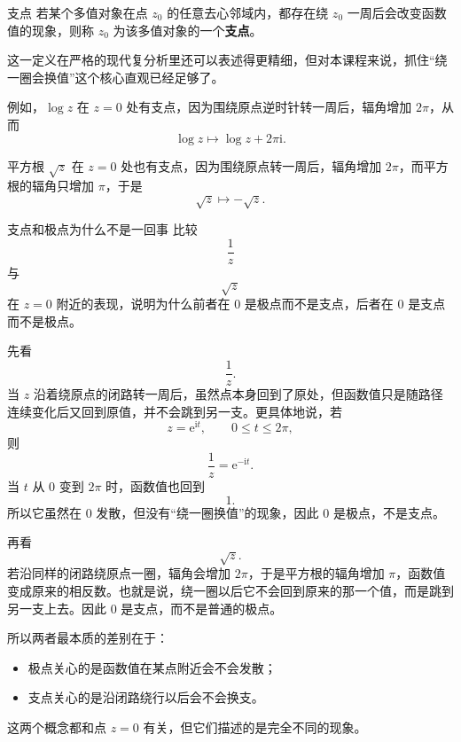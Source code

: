 \begin{dingliyi}{支点}{}
若某个多值对象在点 $z_0$ 的任意去心邻域内，都存在绕 $z_0$ 一周后会改变函数值的现象，则称 $z_0$ 为该多值对象的一个\textbf{支点}。
\end{dingliyi}

\begin{zhu}{}{}
这一定义在严格的现代复分析里还可以表述得更精细，但对本课程来说，抓住``绕一圈会换值''这个核心直观已经足够了。
\end{zhu}

例如，$\log z$ 在 $z=0$ 处有支点，因为围绕原点逆时针转一周后，辐角增加 $2\pi$，从而
\[
    \log z
    \longmapsto
    \log z+2\pi\mathrm{i}.
\]

平方根 $\sqrt{z}$ 在 $z=0$ 处也有支点，因为围绕原点转一周后，辐角增加 $2\pi$，而平方根的辐角只增加 $\pi$，于是
\[
    \sqrt{z}
    \longmapsto
    -\sqrt{z}.
\]

\begin{lizi}{支点和极点为什么不是一回事}{}
比较
\[
    \frac{1}{z}
\]
与
\[
    \sqrt{z}
\]
在 $z=0$ 附近的表现，说明为什么前者在 $0$ 是极点而不是支点，后者在 $0$ 是支点而不是极点。

\begin{jie}
先看
\[
    \frac{1}{z}.
\]
当 $z$ 沿着绕原点的闭路转一周后，虽然点本身回到了原处，但函数值只是随路径连续变化后又回到原值，并不会跳到另一支。更具体地说，若
\[
    z=\mathrm{e}^{\mathrm{i}t},\qquad 0\le t\le 2\pi,
\]
则
\[
    \frac{1}{z}=\mathrm{e}^{-\mathrm{i}t}.
\]
当 $t$ 从 $0$ 变到 $2\pi$ 时，函数值也回到
\[
    1.
\]
所以它虽然在 $0$ 发散，但没有``绕一圈换值''的现象，因此 $0$ 是极点，不是支点。

再看
\[
    \sqrt{z}.
\]
若沿同样的闭路绕原点一圈，辐角会增加 $2\pi$，于是平方根的辐角增加 $\pi$，函数值变成原来的相反数。也就是说，绕一圈以后它不会回到原来的那一个值，而是跳到另一支上去。因此 $0$ 是支点，而不是普通的极点。

所以两者最本质的差别在于：
\begin{itemize}
    \item 极点关心的是函数值在某点附近会不会发散；
    \item 支点关心的是沿闭路绕行以后会不会换支。
\end{itemize}

这两个概念都和点 $z=0$ 有关，但它们描述的是完全不同的现象。
\end{jie}
\end{lizi}

